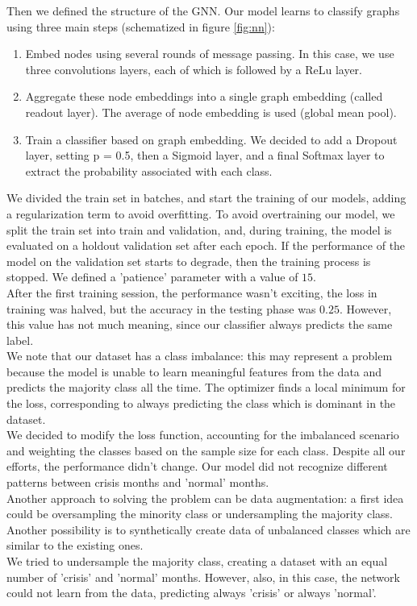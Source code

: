 Then we defined the structure of the GNN. Our model learns to classify graphs using three main steps (schematized in figure \ref{fig:nn}):
\begin{enumerate}
    \item Embed nodes using several rounds of message passing. In this case, we use three convolutions layers, each of which is followed by a ReLu layer.
    \item Aggregate these node embeddings into a single graph embedding (called readout layer). The average of node embedding is used (global mean pool).
    \item Train a classifier based on graph embedding. We decided to add a Dropout layer, setting p = 0.5, then a Sigmoid layer, and a final Softmax layer to extract the probability associated with each class.
\end{enumerate}
We divided the train set in batches, and start the training of our models, adding a regularization term to avoid overfitting. To avoid overtraining our model, we split the train set into train and validation, and, during training, the model is evaluated on a holdout validation set after each epoch. If the performance of the model on the validation set starts to degrade, then the training process is stopped. We defined a 'patience' parameter with a value of $15$. \\

After the first training session, the performance wasn't exciting, the loss in training was halved, but the accuracy in the testing phase was $0.25$. However, this value has not much meaning, since our classifier always predicts the same label.\\

We note that our dataset has a class imbalance: this may represent a problem because the model is unable to learn meaningful features from the data and predicts the majority class all the time.
 The optimizer finds a local minimum for the loss, corresponding to always predicting the class which is dominant in the dataset.\\

We decided to modify the loss function, accounting for the imbalanced scenario and weighting the classes based on the sample size for each class. Despite all our efforts, the performance didn't change. Our model did not recognize different patterns between crisis months and 'normal' months.\\


Another approach to solving the problem can be data augmentation: a first idea could be oversampling the minority class or undersampling the majority class.
 Another possibility is to synthetically create data of unbalanced classes which are similar to the existing ones.\\
We tried to undersample the majority class, creating a dataset with an equal number of 'crisis' and 'normal' months. However, also, in this case, the network could not learn from the data, predicting always 'crisis' or always 'normal'.\\

